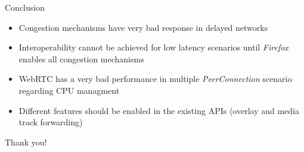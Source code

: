\documentclass[first=red,second=purple,logo=yellowexc]{aaltoslides}
\begin{document}
\begin{frame}{Conclusion}

\begin{itemize}
\item Congestion mechanisms have very bad response in delayed networks
\item Interoperability cannot be achieved for low latency scenarios until {\it Firefox} enables all congestion mechanisms 
\item WebRTC has a very bad performance in multiple {\it PeerConnection} scenario regarding CPU managment
\item Different features should be enabled in the existing APIs (overlay and media track forwarding)
\end{itemize}

\end{frame}
\begin{frame}{}

\centering Thank you!

\end{frame}
\end{document}

